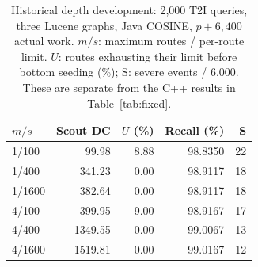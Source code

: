 \begin{table}[t]
\centering
\caption{Historical depth development: 2,000 T2I queries, three Lucene graphs, Java COSINE, $p+6{,}400$ actual work. $m/s$: maximum routes / per-route limit. $U$: routes exhausting their limit before bottom seeding (\%); S: severe events / 6,000. These are separate from the C++ results in Table~\ref{tab:fixed}.}
\label{tab:depthhistory}
\small
\begin{tabular}{@{}lrrrr@{}}
\toprule
$m/s$ & Scout DC & $U$ (\%) & Recall (\%) & S \\
\midrule
1/100 & 99.98 & 8.88 & 98.8350 & 22 \\
1/400 & 341.23 & 0.00 & 98.9117 & 18 \\
1/1600 & 382.64 & 0.00 & 98.9117 & 18 \\
4/100 & 399.95 & 9.00 & 98.9167 & 17 \\
4/400 & 1349.55 & 0.00 & 99.0067 & 13 \\
4/1600 & 1519.81 & 0.00 & 99.0167 & 12 \\
\bottomrule
\end{tabular}
\end{table}

